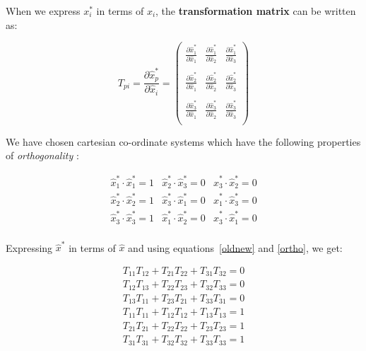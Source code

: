 When we express $x_i^*$ in terms of $x_i$, the {\bf transformation matrix} can be written as: 

\begin{equation}
T_{pi} = \frac{\partial \hat{x}_p^*}{\partial \hat{x}_i} =
\left( 
\begin{array}{lll}
\frac{\partial \hat{x}_1^*}{\partial \hat{x}_1} &
\frac{\partial \hat{x}_1^*}{\partial \hat{x}_2} &
\frac{\partial \hat{x}_1^*}{\partial \hat{x}_3} \\
\\
\frac{\partial \hat{x}_2^*}{\partial \hat{x}_1} &
\frac{\partial \hat{x}_2^*}{\partial \hat{x}_2} &
\frac{\partial \hat{x}_2^*}{\partial \hat{x}_3} \\
\\
\frac{\partial \hat{x}_3^*}{\partial \hat{x}_1} &
\frac{\partial \hat{x}_3^*}{\partial \hat{x}_2} &
\frac{\partial \hat{x}_3^*}{\partial \hat{x}_3} \\
\end{array}
\right) 
\end{equation}

We have chosen cartesian co-ordinate systems which have the following properties of {\em orthogonality} :

\begin{equation}
\label{ortho}
\begin{array}{lll}
\hat{x}^*_1 \cdot \hat{x}^*_1 = 1 & \hat{x}^*_2 \cdot \hat{x}^*_3 = 0 & \hat{x}^*_3 \cdot \hat{x}^*_2 = 0  \\
\hat{x}^*_2 \cdot \hat{x}^*_2 = 1 & \hat{x}^*_3 \cdot \hat{x}^*_1 = 0 & \hat{x}^*_1 \cdot \hat{x}^*_3 = 0  \\
\hat{x}^*_3 \cdot \hat{x}^*_3 = 1 & \hat{x}^*_1 \cdot \hat{x}^*_2 = 0 & \hat{x}^*_3 \cdot \hat{x}^*_1 = 0 \\
\end{array} 
\end{equation} 


Expressing $\hat{x}^*$ in terms of $\hat{x}$ and using equations~\ref{oldnew} and \ref{ortho}, we get:

\begin{equation}
\begin{array}{l}
T_{11}T_{12} + T_{21}T_{22} + T_{31}T_{32} = 0 \\
T_{12}T_{13} + T_{22}T_{23} + T_{32}T_{33} = 0 \\
T_{13}T_{11} + T_{23}T_{21} + T_{33}T_{31} = 0 \\
T_{11}T_{11} + T_{12}T_{12} + T_{13}T_{13} = 1 \\
T_{21}T_{21} + T_{22}T_{22} + T_{23}T_{23} = 1 \\
T_{31}T_{31} + T_{32}T_{32} + T_{33}T_{33} = 1
\end{array} 
\end{equation} 

